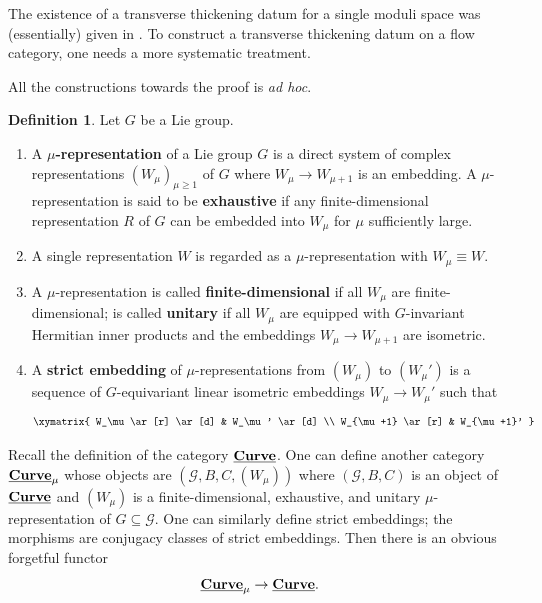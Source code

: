 \documentclass[reqno, 10pt]{amsart}
\numberwithin{equation}{section}
\numberwithin{equation}{section}
\renewcommand{\subset}{\subseteq}
\theoremstyle{definition}
\newtheorem{defn}[thm]{Definition}
\theoremstyle{remark}
\newcommand{\beqn}{\begin{equation*}}
\newcommand{\eeqn}{\end{equation*}}
\newcommand{\mc}{\mathcal}
\newcommand{\uds}[1]{\underline{\smash{#1}}}
\begin{document}
The existence of a transverse thickening datum for a single moduli space was (essentially) given in \cite[Section 4.1]{AMS2}. To construct a transverse thickening datum on a flow category, one needs a more systematic treatment. 

All the constructions towards the proof is {\it ad hoc}.

\begin{defn}
Let $G$ be a Lie group.
\begin{enumerate}

\item A {\bf $\mu$-representation} of a Lie group $G$ is a direct system of complex representations $(W_\mu)_{\mu \geq 1}$ of $G$ where $W_\mu \to W_{\mu+1}$ is an embedding. A $\mu$-representation is said to be {\bf exhaustive} if any finite-dimensional representation $R$ of $G$ can be embedded into $W_\mu$ for $\mu$ sufficiently large. 

\item A single representation $W$ is regarded as a $\mu$-representation with $W_\mu \equiv W$.

\item A $\mu$-representation is called {\bf finite-dimensional} if all $W_\mu$ are finite-dimensional; is called {\bf unitary} if all $W_\mu$ are equipped with $G$-invariant Hermitian inner products and the embeddings $W_\mu \to W_{\mu+1}$ are isometric.

\item A {\bf strict embedding} of $\mu$-representations from $(W_\mu)$ to $(W_\mu')$ is a sequence of $G$-equivariant linear isometric embeddings $W_\mu \to W_{\mu}'$ such that 
\beqn
\xymatrix{  W_\mu \ar[r] \ar[d] & W_\mu' \ar[d] \\
 W_{\mu+1} \ar[r] & W_{\mu+1}' }
 \eeqn
 \end{enumerate}
\end{defn}

Recall the definition of the category $\uds{\bf Curve}$. One can define another category $\uds{\bf Curve}_\mu$ whose objects are $({\mc G}, B, C, (W_\mu))$ where $({\mc G}, B, C)$ is an object of $\uds{\bf Curve}$ and $(W_\mu)$ is a finite-dimensional, exhaustive, and unitary $\mu$-representation of $G \subset {\mc G}$. One can similarly define strict embeddings; the morphisms are conjugacy classes of strict embeddings. Then there is an obvious forgetful functor
\beqn
\uds{\bf Curve}_\mu \to \uds{\bf Curve}.
\eeqn
\end{document}
